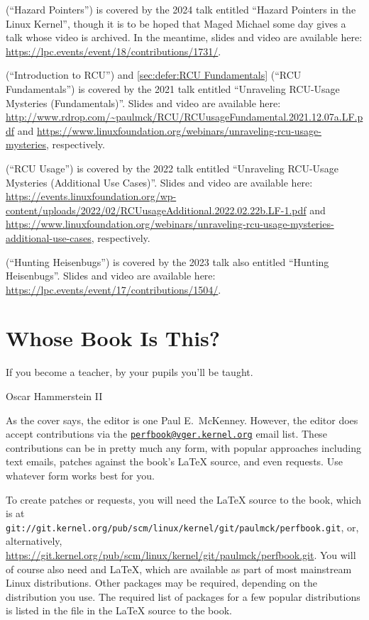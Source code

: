  (``Hazard Pointers'') is covered by
the 2024 talk entitled ``Hazard Pointers in the Linux Kernel'', though
it is to be hoped that Maged Michael some day gives a talk whose video
is archived.
In the meantime, slides and video are available here:
\url{https://lpc.events/event/18/contributions/1731/}.

 (``Introduction to RCU'')
and
\cref{sec:defer:RCU Fundamentals} (``RCU Fundamentals'')
is covered by the 2021 talk entitled ``Unraveling RCU-Usage Mysteries
(Fundamentals)''.
Slides and video are available here:
\url{http://www.rdrop.com/~paulmck/RCU/RCUusageFundamental.2021.12.07a.LF.pdf}
and
\url{https://www.linuxfoundation.org/webinars/unraveling-rcu-usage-mysteries},
respectively.

 (``RCU Usage'')
is covered by the 2022 talk entitled ``Unraveling RCU-Usage Mysteries
(Additional Use Cases)''.
Slides and video are available here:
\url{https://events.linuxfoundation.org/wp-content/uploads/2022/02/RCUusageAdditional.2022.02.22b.LF-1.pdf}
and
\url{https://www.linuxfoundation.org/webinars/unraveling-rcu-usage-mysteries-additional-use-cases},
respectively.

 (``Hunting Heisenbugs'')
is covered by the 2023 talk also entitled ``Hunting Heisenbugs''.
Slides and video are available here:
\url{https://lpc.events/event/17/contributions/1504/}.

\section{Whose Book Is This?}
\label{sec:howto:Whose Book Is This?}
%
\epigraph{If you become a teacher, by your pupils you'll be taught.}
	 {Oscar Hammerstein II}

As the cover says, the editor is one Paul E.~McKenney.
However, the editor does accept contributions via the
\href{mailto:perfbook@vger.kernel.org}
{\nolinkurl{perfbook@vger.kernel.org}} email list.
These contributions can be in pretty much any form, with popular
approaches including text emails,
patches against the book's \LaTeX{} source, and even  requests.
Use whatever form works best for you.

To create patches or  requests, you will need the
\LaTeX{} source to the book, which is at
\nolinkurl{git://git.kernel.org/pub/scm/linux/kernel/git/paulmck/perfbook.git},
or, alternatively,
\url{https://git.kernel.org/pub/scm/linux/kernel/git/paulmck/perfbook.git}.
You will of course also need  and \LaTeX{}, which are
available as part of most mainstream Linux distributions.
Other packages may be required, depending on the distribution you use.
The required list of packages for a few popular distributions is listed
in the file  in the \LaTeX{} source to the book.

